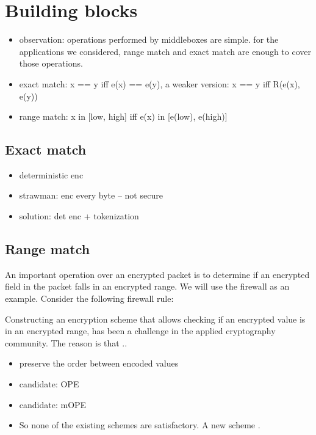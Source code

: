 \section{Building blocks}\label{sec:blocks}

\begin{itemize}
\item observation: operations performed by middleboxes are simple. for the applications we considered, range match and exact match are enough to cover those operations.
\item exact match: x == y iff e(x) == e(y), a weaker version: x == y iff R(e(x), e(y))
\item range match: x in [low, high] iff e(x) in [e(low), e(high)]

\end{itemize}


\subsection{Exact match}

\begin{itemize}
\item deterministic enc
\item strawman: enc every byte -- not secure
\item solution: det enc + tokenization
\end{itemize}

\subsection{Range match}
An important operation over an encrypted packet is to determine if an encrypted field in the packet falls in an encrypted range.
We will use the firewall as an example. 
Consider the following firewall rule:

Constructing an encryption scheme that allows checking if an encrypted value is in an encrypted range, has been a challenge in the applied cryptography community. The reason is that ..

\begin{itemize}
\item preserve the order between encoded values
\item candidate: OPE
\item candidate: mOPE
\item So none of the existing schemes are satisfactory. A new scheme \RM.
\end{itemize}

